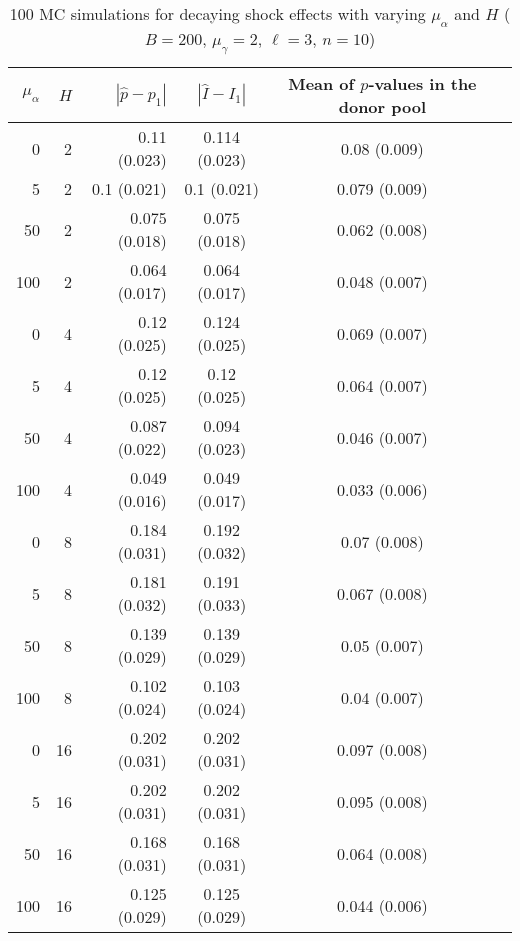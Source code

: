 \documentclass[12pt]{article}
\theoremstyle{definition}
\theoremstyle{definition}
\begin{document}
\begin{table}[H]
\caption{100 MC simulations for decaying shock effects with varying $\mu_{\alpha}$ and $H$  ($B = 200$, $\mu_{\gamma}=2$, $\ell = 3$, $n=10$)} 
\begin{center}
\begin{tabular}{rrrccc}
  \hline
 $\mu_{\alpha}$ & $H$ & $|\hat{p}-p_1|$ & $|\hat{I}- I_1|$ & Mean of $p$-values in the donor pool \\ 
  \hline
 0 & 2 & 0.11 (0.023) & 0.114 (0.023) & 0.08 (0.009) \\ 
 5 & 2 & 0.1 (0.021) & 0.1 (0.021) & 0.079 (0.009) \\ 
 50 & 2 & 0.075 (0.018) & 0.075 (0.018) & 0.062 (0.008) \\ 
   100 & 2 & 0.064 (0.017) & 0.064 (0.017) & 0.048 (0.007)  \\[.15cm]  
    \hline 
   0 & 4 & 0.12 (0.025) & 0.124 (0.025) & 0.069 (0.007) \\ 
   5 & 4 & 0.12 (0.025) & 0.12 (0.025) & 0.064 (0.007) \\ 
   50 & 4 & 0.087 (0.022) & 0.094 (0.023) & 0.046 (0.007) \\ 
   100 & 4 & 0.049 (0.016) & 0.049 (0.017) & 0.033 (0.006)  \\[.15cm]  
    \hline 
   0 & 8 & 0.184 (0.031) & 0.192 (0.032) & 0.07 (0.008) \\ 
   5 & 8 & 0.181 (0.032) & 0.191 (0.033) & 0.067 (0.008) \\ 
   50 & 8 & 0.139 (0.029) & 0.139 (0.029) & 0.05 (0.007) \\ 
   100 & 8 & 0.102 (0.024) & 0.103 (0.024) & 0.04 (0.007)  \\[.15cm]   
    \hline 
   0  & 16  & 0.202 (0.031) & 0.202 (0.031) & 0.097 (0.008) \\ 
   5 & 16 & 0.202 (0.031) & 0.202 (0.031) & 0.095 (0.008) \\ 
   50 & 16 & 0.168 (0.031) & 0.168 (0.031) & 0.064 (0.008) \\ 
   100 & 16 & 0.125 (0.029) & 0.125 (0.029) & 0.044 (0.006) \\ 
   \hline
\end{tabular}
\end{center}
\end{table}
\end{document}
